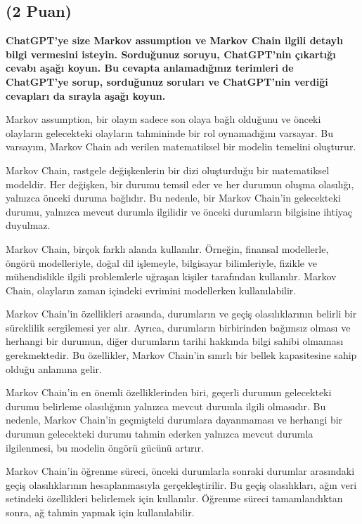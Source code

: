 \documentclass[11pt]{article}
\begin{document}
\subsection{(2 Puan)} \textbf{ChatGPT’ye size Markov assumption ve Markov Chain ilgili detaylı bilgi vermesini isteyin. Sorduğunuz soruyu, ChatGPT'nin çıkartığı cevabı aşağı koyun. Bu cevapta anlamadığınız terimleri de ChatGPT’ye sorup, sorduğunuz soruları ve ChatGPT’nin verdiği cevapları da sırayla aşağı koyun.}

Markov assumption, bir olayın sadece son olaya bağlı olduğunu ve önceki olayların gelecekteki olayların tahmininde bir rol oynamadığını varsayar. Bu varsayım, Markov Chain adı verilen matematiksel bir modelin temelini oluşturur.

Markov Chain, rastgele değişkenlerin bir dizi oluşturduğu bir matematiksel modeldir. Her değişken, bir durumu temsil eder ve her durumun oluşma olasılığı, yalnızca önceki duruma bağlıdır. Bu nedenle, bir Markov Chain'in gelecekteki durumu, yalnızca mevcut durumla ilgilidir ve önceki durumların bilgisine ihtiyaç duyulmaz.

Markov Chain, birçok farklı alanda kullanılır. Örneğin, finansal modellerle, öngörü modelleriyle, doğal dil işlemeyle, bilgisayar bilimleriyle, fizikle ve mühendislikle ilgili problemlerle uğraşan kişiler tarafından kullanılır. Markov Chain, olayların zaman içindeki evrimini modellerken kullanılabilir.

Markov Chain'in özellikleri arasında, durumların ve geçiş olasılıklarının belirli bir süreklilik sergilemesi yer alır. Ayrıca, durumların birbirinden bağımsız olması ve herhangi bir durumun, diğer durumların tarihi hakkında bilgi sahibi olmaması gerekmektedir. Bu özellikler, Markov Chain'in sınırlı bir bellek kapasitesine sahip olduğu anlamına gelir.

Markov Chain'in en önemli özelliklerinden biri, geçerli durumun gelecekteki durumu belirleme olasılığının yalnızca mevcut durumla ilgili olmasıdır. Bu nedenle, Markov Chain'in geçmişteki durumlara dayanmaması ve herhangi bir durumun gelecekteki durumu tahmin ederken yalnızca mevcut durumla ilgilenmesi, bu modelin öngörü gücünü artırır.

Markov Chain'in öğrenme süreci, önceki durumlarla sonraki durumlar arasındaki geçiş olasılıklarının hesaplanmasıyla gerçekleştirilir. Bu geçiş olasılıkları, ağın veri setindeki özellikleri belirlemek için kullanılır. Öğrenme süreci tamamlandıktan sonra, ağ tahmin yapmak için kullanılabilir.
\end{document}
